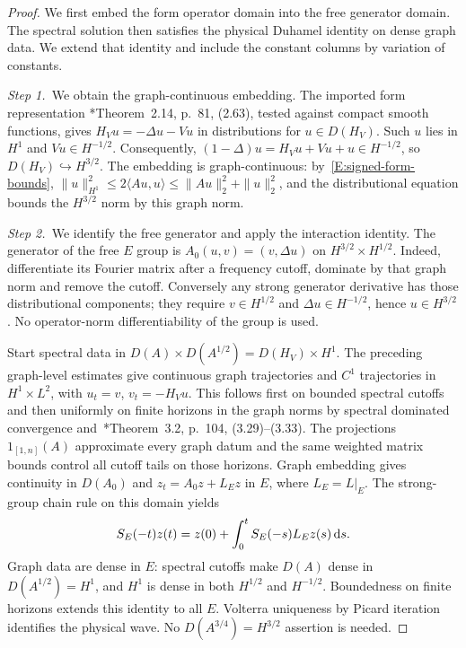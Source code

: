 \begin{proof}
  We first embed the form operator domain into the free generator domain. The
  spectral solution then satisfies the physical Duhamel identity on dense
  graph data. We extend that identity and include the constant columns by
  variation of constants.


  \medskip
  \noindent\textit{Step 1.~}We obtain the graph-continuous embedding.
  The imported form representation \cite{teschl:14:mathematical}*{Theorem~2.14,
  p.~81, (2.63)}, tested against compact smooth functions, gives $H_Vu = -\Delta
  u-Vu$ in distributions for $u \in D(H_V)$. Such $u$ lies in $H^1$ and $Vu \in
  H^{-1/2}$. Consequently, $(1-\Delta)u = H_Vu+Vu+u \in H^{-1/2}$, so
  $D(H_V)\hookrightarrow H^{3/2}$. The embedding is graph-continuous:
  by~\eqref{E:signed-form-bounds}, $\|u\|_{H^1}^2 \le 2\langle Au,u\rangle \le
  \|Au\|_2^2+\|u\|_2^2$, and the distributional equation bounds the $H^{3/2}$
  norm by this graph norm.


  \medskip
  \noindent\textit{Step 2.~}We identify the free generator and apply the
  interaction identity.
  The generator of the free $E$ group is $A_0(u,v) = (v,\Delta u)$ on
  $H^{3/2}\times H^{1/2}$. Indeed, differentiate its Fourier matrix after a
  frequency cutoff, dominate by that graph norm and remove the cutoff.
  Conversely any strong generator derivative has those distributional
  components; they require $v \in H^{1/2}$ and $\Delta u \in H^{-1/2}$, hence $u
  \in H^{3/2}$. No operator-norm differentiability of the group is used.

  Start spectral data in $D(A)\times D(A^{1/2}) = D(H_V)\times H^1$. The
  preceding graph-level estimates give continuous graph trajectories and $C^1$
  trajectories in $H^1\times L^2$, with $u_t = v$, $v_t = -H_Vu$. This follows
  first on bounded spectral cutoffs and then uniformly on finite horizons in the
  graph norms by spectral dominated convergence
  and~\cite{teschl:14:mathematical}*{Theorem~3.2, p.~104, (3.29)--(3.33)}. The
  projections $1_{[1,n]}(A)$ approximate every graph datum and the same weighted
  matrix bounds control all cutoff tails on those horizons. Graph embedding
  gives continuity in $D(A_0)$ and $z_t = A_0z+L_Ez$ in $E$, where $L_E = L|_E$.
  The strong-group chain rule on this domain yields
  \[
    S_E(-t)z(t)=z(0)+\int_0^t S_E(-s)L_Ez(s)\,\mathrm{d} s .
  \]
  Graph data are dense in $E$: spectral cutoffs make $D(A)$ dense in $D(A^{1/2})
  = H^1$, and $H^1$ is dense in both $H^{1/2}$ and $H^{-1/2}$. Boundedness on
  finite horizons extends this identity to all $E$. Volterra uniqueness by
  Picard iteration identifies the physical wave. No $D(A^{3/4}) = H^{3/2}$
  assertion is needed.



\end{proof}
